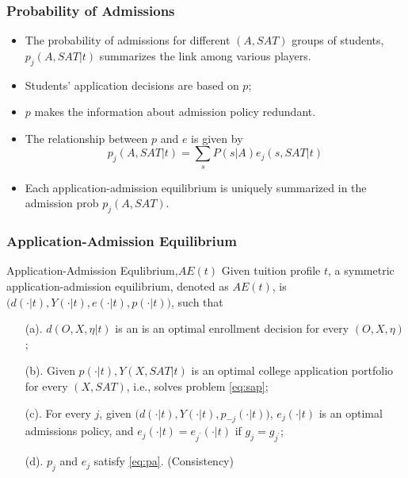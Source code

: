 \documentclass[10pt]{beamer}
\begin{document}
\begin{frame}[c]\frametitle{Probability of Admissions}
\begin{itemize}
    \item The probability of admissions for different $(A,SAT)$ groups of students, $p_{j}(A,SAT|t)$ summarizes the link among various players.
    \item Students' application decisions are based on $p$;
    \item $p$ makes the information about admission policy redundant.
    \item The relationship between $p$ and $e$ is given by
    \begin{equation}\label{eq:pa}
        p_{j}(A,SAT|t) = \sum_{s} P(s|A) e_{j}(s,SAT|t)
    \end{equation}
    \item Each application-admission equilibrium is uniquely summarized in the admission prob $p_{j}(A,SAT)$.
\end{itemize}

\end{frame}

\begin{frame}[c]\frametitle{Application-Admission Equilibrium}

\begin{alertblock}{Application-Admission Equlibrium,$AE(t)$}
    Given tuition profile $t$, a symmetric application-admission equilibrium, denoted as $AE(t)$, is $\big(d(\cdot|t),Y(\cdot|t),e(\cdot|t),p(\cdot|t)\big)$, such that
\begin{enumerate}
    \item[(a).] $d(O,X,\eta|t)$ is an  is an optimal enrollment decision for every $(O,X,\eta)$;
    \item[(b).] Given $p(\cdot|t),Y(X,SAT|t)$ is an optimal college application portfolio for every $(X,SAT)$, i.e., solves problem \eqref{eq:sap};
    \item[(c).] For every $j$, given $\big(d(\cdot|t),Y(\cdot|t),p_{-j}(\cdot|t)\big)$, $e_{j}(\cdot|t)$ is an optimal admissions policy, and $e_{j}(\cdot|t) = e_{j^{\prime}}(\cdot|t)$ if $g_{j} = g_{j^{\prime}}$;
    \item[(d).] $p_{j}$ and $e_{j}$ satisfy \eqref{eq:pa}. (Consistency)
\end{enumerate}
\end{alertblock}
\end{frame}
\end{document}
